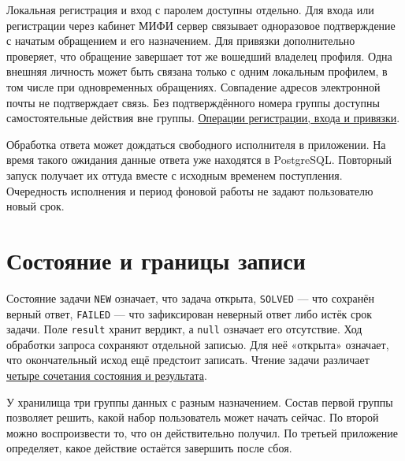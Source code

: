 \documentclass[12pt,a4paper]{article}
\begin{document}
Локальная регистрация и вход с паролем доступны отдельно. Для входа или регистрации через кабинет МИФИ сервер связывает одноразовое подтверждение с начатым обращением и его назначением. Для привязки дополнительно проверяет, что обращение завершает тот же вошедший владелец профиля. Одна внешняя личность может быть связана только с одним локальным профилем, в том числе при одновременных обращениях. Совпадение адресов электронной почты не подтверждает связь. Без подтверждённого номера группы доступны самостоятельные действия вне группы. {\href{DOC-08\_Справочник\_API.pdf\#учётная-запись-и-вход}{Операции регистрации, входа и привязки}}.

Обработка ответа может дождаться свободного исполнителя в приложении. На время такого ожидания данные ответа уже находятся в PostgreSQL. Повторный запуск получает их оттуда вместе с исходным временем поступления. Очередность исполнения и период фоновой работы не задают пользователю новый срок.

\section{Состояние и границы записи}\label{4-ux441ux43eux441ux442ux43eux44fux43dux438ux435-ux438-ux433ux440ux430ux43dux438ux446ux44b-ux437ux430ux43fux438ux441ux438}

\hypertarget{4-состояние-и-границы-записи}{}

Состояние задачи \texttt{NEW} означает, что задача открыта, \texttt{SOLVED} --- что сохранён верный ответ, \texttt{FAILED} --- что зафиксирован неверный ответ либо истёк срок задачи. Поле \texttt{result} хранит вердикт, а \texttt{null} означает его отсутствие. Ход обработки запроса сохраняют отдельной записью. Для неё «открыта» означает, что окончательный исход ещё предстоит записать. Чтение задачи различает {\href{DOC-08\_Справочник\_API.pdf\#3-чтение-состояния-и-восстановление-после-обрыва-связи}{четыре сочетания состояния и результата}}.

У хранилища три группы данных с разным назначением. Состав первой группы позволяет решить, какой набор пользователь может начать сейчас. По второй можно воспроизвести то, что он действительно получил. По третьей приложение определяет, какое действие остаётся завершить после сбоя.
\end{document}
